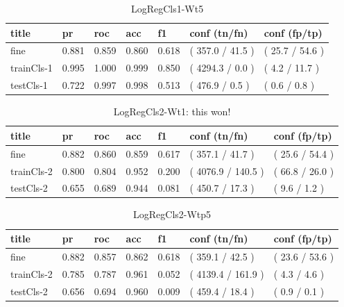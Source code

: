 \documentclass[ms]{nuthesis}
\begin{document}
\FloatBarrier
\begin{table}[H]
\centering
\begin{tabular}{|l||l||l||l||l||l||l|}\toprule
title & pr & roc & acc & f1 & conf (tn/fn) & conf (fp/tp) \\ \midrule
fine & 0.881 & 0.859 & 0.860 & 0.618 & ( 357.0 / 41.5 ) & ( 25.7 / 54.6 ) \\
trainCls-1 & 0.995 & 1.000 & 0.999 & 0.850 & ( 4294.3 / 0.0 ) & ( 4.2 / 11.7 ) \\
testCls-1 & 0.722 & 0.997 & 0.998 & 0.513 & ( 476.9 / 0.5 ) & ( 0.6 / 0.8 ) \\ \bottomrule
\end{tabular}
\caption{LogRegCls1-Wt5}
\label{tab:LogRegCls1-Wt5}
\end{table}
\FloatBarrier

\FloatBarrier
\begin{table}[H]
\centering
\begin{tabular}{|l||l||l||l||l||l||l|}\toprule
title & pr & roc & acc & f1 & conf (tn/fn) & conf (fp/tp) \\ \midrule
fine & 0.882 & 0.860 & 0.859 & 0.617 & ( 357.1 / 41.7 ) & ( 25.6 / 54.4 ) \\
trainCls-2 & 0.800 & 0.804 & 0.952 & 0.200 & ( 4076.9 / 140.5 ) & ( 66.8 / 26.0 ) \\
testCls-2 & 0.655 & 0.689 & 0.944 & 0.081 & ( 450.7 / 17.3 ) & ( 9.6 / 1.2 ) \\ \bottomrule
\end{tabular}
\caption{LogRegCls2-Wt1: this won!}
\label{tab:LogRegCls2-Wt1}
\end{table}
\FloatBarrier

\FloatBarrier
\begin{table}[H]
\centering
\begin{tabular}{|l||l||l||l||l||l||l|}\toprule
title & pr & roc & acc & f1 & conf (tn/fn) & conf (fp/tp) \\ \midrule
fine & 0.882 & 0.857 & 0.862 & 0.618 & ( 359.1 / 42.5 ) & ( 23.6 / 53.6 ) \\
trainCls-2 & 0.785 & 0.787 & 0.961 & 0.052 & ( 4139.4 / 161.9 ) & ( 4.3 / 4.6 ) \\
testCls-2 & 0.656 & 0.694 & 0.960 & 0.009 & ( 459.4 / 18.4 ) & ( 0.9 / 0.1 ) \\ \bottomrule
\end{tabular}
\caption{LogRegCls2-Wtp5}
\label{tab:LogRegCls2-Wtp5}
\end{table}
\FloatBarrier
\end{document}
